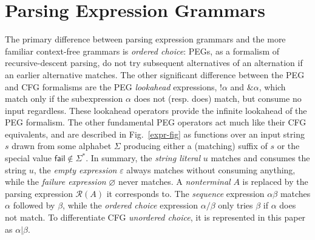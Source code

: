 \documentclass{article}
\newcommand{\Rule}{\mathcal{R}}
\newcommand{\fail}{\mathsf{fail}}
\newcommand{\nl}{\mathord{!}}
\begin{document}
\section{Parsing Expression Grammars}
The primary difference between parsing expression grammars and the more familiar context-free grammars is \emph{ordered choice}: PEGs, as a formalism of recursive-descent parsing, do not try subsequent alternatives of an alternation if an earlier alternative matches. 
The other significant difference between the PEG and CFG formalisms are the PEG \emph{lookahead} expressions, $\nl\alpha$ and $\&\alpha$, which match only if the subexpression $\alpha$ does not (resp. does) match, but consume no input regardless. 
These lookahead operators provide the infinite lookahead of the PEG formalism.
The other fundamental PEG operators act much like their CFG equivalents, and are described in Fig.~\ref{expr-fig} as functions over an input string $s$ drawn from some alphabet $\Sigma$ producing either a (matching) suffix of $s$ or the special value $\fail \not\in \Sigma^*$.
In summary, the \emph{string literal} $u$ matches and consumes the string $u$, the \emph{empty expression} $\varepsilon$ always matches without consuming anything, while the \emph{failure expression} $\varnothing$ never matches. 
A \emph{nonterminal} $A$ is replaced by the parsing expression $\Rule(A)$ it corresponds to.
The \emph{sequence} expression $\alpha\beta$ matches $\alpha$ followed by $\beta$, while the \emph{ordered choice} expression $\alpha/\beta$ only tries $\beta$ if $\alpha$ does not match. 
To differentiate CFG \emph{unordered choice}, it is represented in this paper as $\alpha|\beta$.
\end{document}
